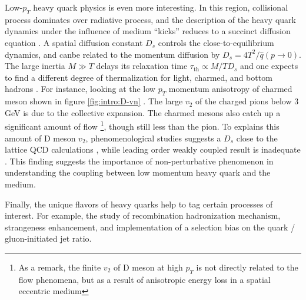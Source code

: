 Low-$p_T$ heavy quark physics is even more interesting.
In this region, collisional process dominates over radiative process, and the description of the heavy quark dynamics under the influence of medium ``kicks'' reduces to a succinct diffusion equation \cite{Moore:2004tg}.
A spatial diffusion constant $D_s$ controls the close-to-equilibrium dynamics, and canbe related to the momentum diffusion by $D_s = 4T^2/\hat{q}(p\rightarrow 0)$.
The large inertia $M\gg T$ delays its relaxation time $\tau_{\textrm{th}} \propto M/T D_s$ and one expects to find a different degree of thermalization for light, charmed, and bottom hadrons \cite{PhysRevD.37.2484,Moore:2004tg,Riek:2010fk,Cao:2013ita}.
For instance, looking at the low $p_T$ momentum anisotropy of charmed meson shown in figure \ref{fig:intro:D-vn} \cite{Acharya:2017qps,Sirunyan:2017plt}.
The large $v_2$ of the charged pions below $3$ GeV is due to the collective expansion.
The charmed mesons also catch up a significant amount of flow \footnote{As a remark, the finite $v_2$ of D meson at high $p_T$ is not directly related to the flow phenomena, but as a result of anisotropic energy loss in a spatial eccentric medium}, though still less than the pion.
To explains this amount of D meson $v_2$, phenomenological studies suggests a $D_s$ close to the lattice QCD calculations \cite{He:2012df,Cao:2013ita,Xu:2017obm,Banerjee:2011ra,Ding:2012sp,Francis:2015daa}, while leading order weakly coupled result \cite{Moore:2004tg} is inadequate . 
This finding suggests the importance of non-perturbative phenomenon in understanding the coupling between low momentum heavy quark and the medium.

Finally, the unique flavors of heavy quarks help to tag certain processes of interest. 
For example, the study of recombination hadronization mechanism, strangeness enhancement, and implementation of a selection bias on the quark / gluon-initiated jet ratio.

